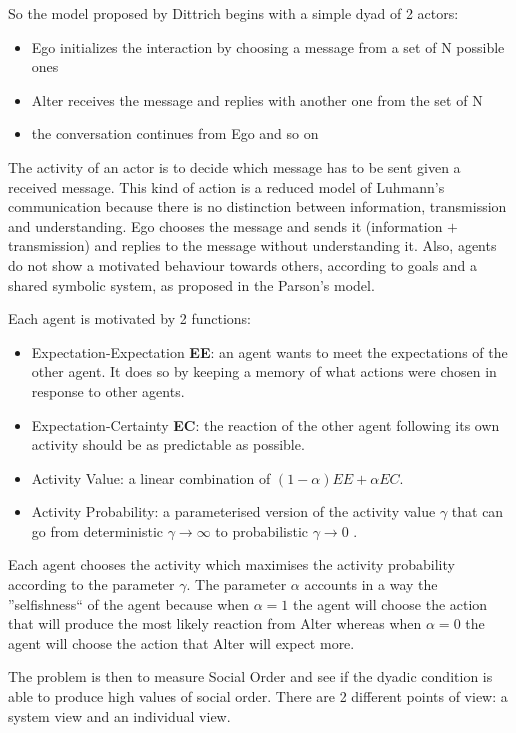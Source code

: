 So the model proposed by Dittrich begins with a simple dyad of 2 actors:
\begin{itemize}
 \item Ego initializes the interaction by choosing a message from a set of N possible ones
 \item Alter receives the message and replies with another one from the set of N
 \item the conversation continues from Ego and so on
\end{itemize}
The activity of an actor is to decide which message has to be sent given a received message.
This kind of action is a reduced model of Luhmann's communication because there 
is no distinction between information, transmission and understanding.
Ego chooses the message and sends it (information $+$ transmission) and
replies to the message without understanding it.
Also, agents do not show a motivated behaviour towards others, according
to goals and a shared symbolic system, as proposed in the Parson's model.

Each agent is motivated by 2 functions:
\begin{itemize}
 \item Expectation-Expectation \textbf{EE}: an agent wants to meet the
expectations of the other agent. It does so by keeping a memory of what actions
were chosen in response to other agents.
 \item Expectation-Certainty \textbf{EC}:  the reaction of the other agent
following its own activity should be as predictable as possible.
 \item Activity Value: a linear combination of $(1 - \alpha)EE + \alpha EC$.
 \item Activity Probability: a parameterised version of the activity
value $\gamma$ that can go from deterministic $\gamma \rightarrow \infty$
to probabilistic $\gamma \rightarrow 0$ .
\end{itemize}

Each agent chooses the activity which maximises the activity probability according
 to the parameter $\gamma$.
The parameter $\alpha$ accounts in a way the ''selfishness`` of the agent because
when $\alpha=1$ the agent will choose the action that will produce the most likely
reaction from Alter whereas when $\alpha=0$ the agent will choose the action
that Alter will expect more.

The problem is then to measure Social Order and see if the dyadic condition is
able to produce high values of social order. There are 2 different points
of view: a system view and an individual view.

